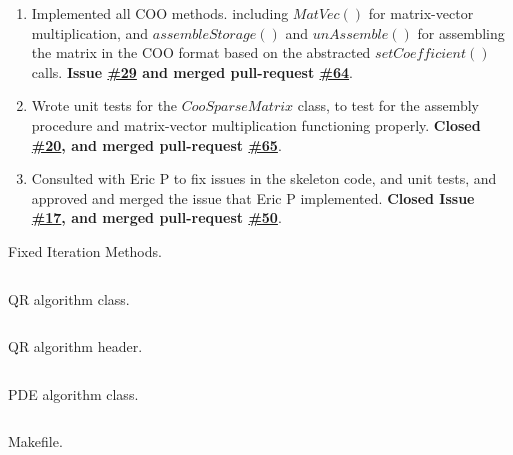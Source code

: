 \documentclass[12pt,letterpaper]{article}
\newenvironment{longlisting}{\captionsetup{type=listing}}{}
\newcommand{\code}[4]{
\begin{longlisting}
    \caption{#3}
    \inputminted{#1}{#2}
    \label{code:#4}
\end{longlisting}
}
\newcommand{\repo}[2]{\href{https://github.com/bkochuna/ners570f20-Lab06/#1/#2}{\##2}}
\begin{document}
\begin{enumerate}
  \item Implemented all COO methods. including $MatVec()$ for matrix-vector multiplication, and $assembleStorage()$ and $unAssemble()$ for assembling the matrix in the COO format based on the abstracted $setCoefficient()$ calls. \textbf{Issue \repo{issues}{29} and merged pull-request \repo{pull}{64}}.

  \item Wrote unit tests for the $CooSparseMatrix$ class, to test for the assembly procedure and matrix-vector multiplication functioning properly. \textbf{Closed \repo{issues}{20}, and merged pull-request \repo{pull}{65}}.

  \item Consulted with Eric P to fix issues in the skeleton code, and unit tests, and approved and merged the issue that Eric P implemented. \textbf{Closed Issue \repo{issues}{17}, and merged pull-request \repo{pull}{50}}.
\end{enumerate}


\newpage
\appendix
\begin{appendix}
\code{python}{figures/Ex1.py}{Fixed Iteration Methods.}{Ex1}
\code{cpp}{figures/QR.cpp}{QR algorithm class.}{QR}
\code{cpp}{figures/QR.hpp}{QR algorithm header.}{QRh}
\code{cpp}{figures/pde.cpp}{PDE algorithm class.}{PDE}
\code{make}{figures/Makefile}{Makefile.}{make}
\end{appendix}
% 
% 
\end{document}
